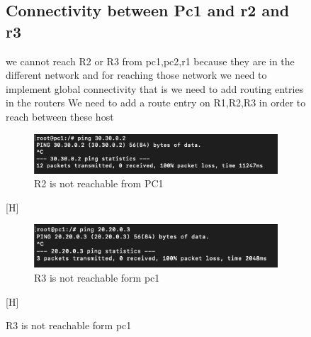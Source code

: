 \begin{figure}[H]
\subsection{Connectivity between Pc1 and r2 and r3}
we cannot reach R2 or R3 from pc1,pc2,r1 because they are in the different network and for reaching those network we need to implement global connectivity that is we need to add routing entries in the routers
\newline We need to add a route entry on R1,R2,R3 in order to reach between these host 
\begin{figure}[H]
\centering
  \includegraphics[width=400pt]{Images/connectivity between pc1 and r2.png}
  \caption{R2 is not reachable from PC1 }
  \label{fig:3.1}
\end{figure} [H]
\begin{figure}[H]
\centering
  \includegraphics[width=400pt]{Images/connectivity between pc1 and r3.png}
  \caption{R3 is not reachable form pc1}
  \label{fig:3.1}
\end{figure} [H]

\end{figure}
